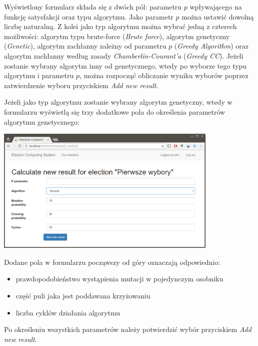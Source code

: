 \documentclass[pdflatex,11pt]{../aghdoc_version2}
\begin{document}
\vspace{\baselineskip}
Wyświetlony formularz składa się z dwóch pól: parametru $p$ wpływającego na funkcję satysfakcji oraz typu algorytmu. Jako parametr $p$ można ustawić dowolną liczbę naturalną. Z kolei jako typ algorytmu można wybrać jedną z czterech możliwości: algorytm typu brute-force (\textit{Brute force}), algorytm genetyczny (\textit{Genetic}), algorytm zachłanny zależny od parametru $p$ (\textit{Greedy Algorithm}) oraz algorytm zachłanny według zasady \textit{Chamberlin-Courant’a} (\textit{Greedy CC}). Jeżeli zostanie wybrany algorytm inny od genetycznego, wtedy po wyborze tego typu algorytmu i parametru $p$, można rozpocząć obliczanie wyniku wyborów poprzez zatwierdzenie wyboru przyciskiem \textit{Add new result}. 

\newpage
Jeżeli jako typ algorytmu zostanie wybrany algorytm genetyczny, wtedy w formularzu wyświetlą się trzy dodatkowe pola do określenia parametrów algorytmu genetycznego: \\

\begin{center}
\includegraphics[width=0.8\textwidth]{pics/new-result-genetic.png}
\end{center}

\vspace{\baselineskip}
Dodane pola w formularzu począwszy od góry oznaczają odpowiednio: 
\begin{itemize}
\item prawdopodobieństwo wystąpienia mutacji w pojedynczym osobniku
\item część puli jaka jest poddawana krzyżowaniu
\item liczba cyklów działania algorytmu
\end{itemize}

Po określeniu wszystkich parametrów należy potwierdzić wybór przyciskiem \textit{Add new result}.
\newpage
\end{document}
